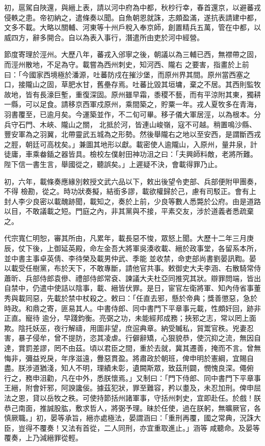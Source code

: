 \begin{pinyinscope}
 初，扈駕自陜還，與縉上表，請以河中府為中都，秋杪行幸，春首還京，以避蕃戎侵軼之患。帝初納之，遣條奏以聞。自魚朝恩就誅，志頗盈滿，遂抗表請建中都，文多不載。大略以關輔、河東等十州戶稅入奉京師，創置精兵五萬，管在中都，以威四方，辭多開合。自以為表入事行，潛遣所由吏於河中經營。



 節度寄理於涇州。大歷八年，蕃戎入邠寧之後，朝議以為三輔已西，無襟帶之固，而涇州散地，不足為守。載嘗為西州刺史，知河西、隴右
 之要害，指畫於上前曰：「今國家西境極於潘源，吐蕃防戍在摧沙堡，而原州界其間。原州當西塞之口，接隴山之固，草肥水甘，舊壘存焉。吐蕃比毀其垣墉，棄之不居。其西則監牧故地，皆有長濠巨塹，重復深固。原州雖早霜，黍稷不藝，而有平涼附其東，獨耕一縣，可以足食。請移京西軍戍原州，乘間築之，貯粟一年。戎人夏牧多在青海，羽書覆至，已逾月矣。今運築並作，不二旬可畢。移子儀大軍居涇，以為根本。分兵守石門、木峽、隴山之關，
 北抵於河，皆連山峻嶺，寇不可越。稍置鳴沙縣、豐安軍為之羽翼，北帶靈武五城為之形勢。然後舉隴右之地以至安西，是謂斷西戎之脛，朝廷可高枕矣。」兼圖其地形以獻。載密使人逾隴山，入原州，量井泉，計徒庸，車乘畚鍤之器皆具。檢校左僕射田神功沮之曰：「夫興師料敵，老將所難。陛下信一書生言，舉國從之，聽誤矣。」上遲疑不決，會載得罪乃止。



 初，六年，載條奏應緣別敕授文武六品以下，敕出後望令吏部、兵部便附甲團奏，不得
 檢勘，從之。時功狀奏擬，結銜多謬，載欲權歸於己，慮有司駁正。會有上封人李少良密以載醜跡聞，載知之，奏於上前，少良等數人悉斃於公府。由是道路以目，不敢議載之短。門庭之內，非其黨與不接，平素交友，涉於道義者悉疏棄之。



 代宗寬仁明恕，審其所由，凡累年，載長惡不悛，眾怒上聞。大歷十二年三月庚辰，仗下後，上御延英殿，命左金吾大將軍吳湊收載、縉於政事堂，各留系本所，並中書主事卓英倩、李待榮及載男仲武、季能
 並收禁，命吏部尚書劉晏訊鞫。晏以載受任樹黨，布於天下，不敢專斷，請他官共事。敕御史大夫李涵、右散騎常侍蕭昕、兵部侍郎袁傪、禮部侍郎常袞、諫議大夫杜亞同推究其狀。辯罪問端，皆出自禁中，仍遣中使詰以陰事，載、縉皆伏罪。是日，宦官左衛將軍、知內侍省事董秀與載同惡，先載於禁中杖殺之。敕曰：「任直去邪，懸於帝典；獎善懲惡，急於時政。和鼎之寄，匪易其人。中書侍郎、同中書門下平章事元載，性頗奸回，跡非正直。寵待
 逾分，早踐鈞衡。亮弼之功，未能經邦成務；挾邪之志，常以罔上面欺。陰托妖巫，夜行解禱，用圖非望，庶逭典章。納受贓私，貿鬻官秩。兇妻忍害，暴子侵牟，曾不提防，恣其凌虐。行僻辭矯，心狠貌恭，使沉抑之流，無因自達，賞罰差謬，罔不由茲。頃以君臣之間，重於去就，冀其遷善，掩而不言。曾無悔非，彌益兇戾，年序滋遠，釁惡貫盈。將肅政於朝班，俾申明於憲綱，宜賜自盡。朕涉道猶淺，知人不明，理績未彰，遺闕斯眾，致茲刑闢，憫愧良深。僶俯
 行之，務申沮勸，凡在中外，悉朕懷焉。」又制曰：「門下侍郎、同中書門下平章事王縉，附會奸邪，阿諛讒佞。據茲犯狀，罪至難容，矜以耋及，未忍加刑。俾申屈法之恩，貸以岳牧之秩。可使持節括州諸軍事，守括州刺史，宜即赴任。於戲！朕恭己南面，推誠股肱，敷求哲人，將弼予理。昧於任使，過在朕躬，無曠厥官，各慎厥職。」初，晏等承旨，縉亦處極法，晏謂涵曰：「重刑再覆，國之常典，況誅大臣，豈得不覆奏！又法有首從，二人同刑，亦宜重取進止。」涵等
 咸聽命。及晏等覆奏，上乃減縉罪從輕。




\end{pinyinscope}
